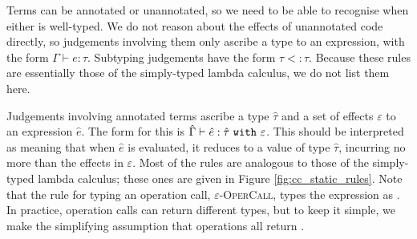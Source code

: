 Terms can be annotated or unannotated, so we need to be able to
recognise when either is well-typed. We do not reason about the
effects of unannotated code directly, so judgements involving them
only ascribe a type to an expression, with the form $\Gamma \vdash e: \tau$.
Subtyping judgements have the form $\tau <: \tau$. Because these rules are
essentially those of the simply-typed lambda calculus, we do not list
them here.

Judgements involving annotated terms ascribe a type $\hat \tau$ and a
set of effects $\varepsilon$ to an expression $\hat e$. The form for this is
$\hat \Gamma \vdash \hat e: \hat \tau~\mathtt{with}~ \varepsilon$. This should
be interpreted as meaning that when $\hat e$ is evaluated, it reduces to a
value of type $\hat \tau$, incurring no more than the effects in $\varepsilon$.
Most of the rules are analogous to those of the simply-typed lambda calculus;
these ones are given in Figure \ref{fig:cc_static_rules}. Note that the rule for
typing an operation call, \textsc{$\varepsilon$-OperCall}, types the expression
as . In practice, operation calls can return different types, but to
keep it simple, we make the simplifying assumption that operations all return
.

